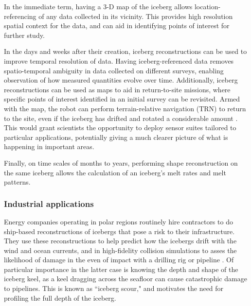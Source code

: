 In the immediate term, having a 3-D map of the iceberg allows location-referencing of any data collected in its vicinity. This provides high resolution spatial context for the data, and can aid in identifying points of interest for further study. 

In the days and weeks after their creation, iceberg reconstructions can be used to improve temporal resolution of data. Having iceberg-referenced data removes spatio-temporal ambiguity in data collected on different surveys, enabling observation of how measured quantities evolve over time. Additionally, iceberg reconstructions can be used as maps to aid in return-to-site missions, where specific points of interest identified in an initial survey can be revisited. Armed with the map, the robot can perform terrain-relative navigation (TRN) to return to the site, even if the iceberg has drifted and rotated a considerable amount \cite{Kimball2011b}. This would grant scientists the opportunity to deploy sensor suites tailored to particular applications, potentially giving a much clearer picture of what is happening in important areas.

Finally, on time scales of months to years, performing shape reconstruction on the same iceberg allows the calculation of an iceberg's melt rates and melt patterns.

\subsubsection{Industrial applications}

Energy companies operating in polar regions routinely hire contractors to do ship-based reconstructions of icebergs that pose a risk to their infrastructure. They use these reconstructions to help predict how the icebergs drift with the wind and ocean currents, and in high-fidelity collision simulations to asses the likelihood of damage in the even of impact with a drilling rig or pipeline \cite{ralph2008iceberg} \cite{fuglem1996iceberg}. Of particular importance in the latter case is knowing the depth and shape of the iceberg keel, as a keel dragging across the seafloor can cause catastrophic damage to pipelines. This is known as ``iceberg scour," and motivates the need for profiling the full depth of the iceberg.

